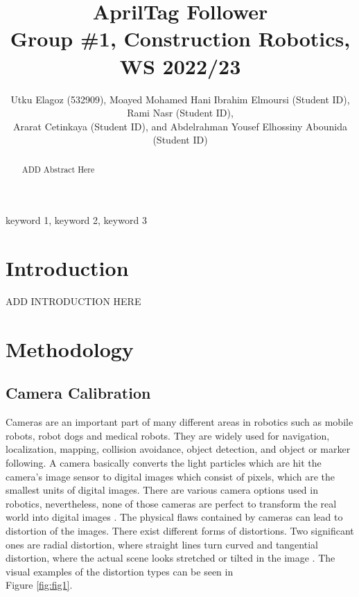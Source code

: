 \documentclass[conference]{IEEEtran}
\begin{document}
\title{AprilTag Follower\\
{\footnotesize Group \#1, Construction Robotics, WS 2022/23}
}

\author{Utku Elagoz (532909), Moayed Mohamed Hani Ibrahim Elmoursi (Student ID), Rami Nasr (Student ID),\\ Ararat Cetinkaya (Student ID), and Abdelrahman Yousef Elhossiny Abounida (Student ID)}

\maketitle
\thispagestyle{plain}
\pagestyle{plain}

\begin{abstract}
ADD Abstract Here
\end{abstract}

\begin{IEEEkeywords}
keyword 1, keyword 2, keyword 3
\end{IEEEkeywords}

\section{Introduction}
ADD INTRODUCTION HERE

\section{Methodology}
    \subsection{Camera Calibration}
        Cameras are an important part of many different areas in robotics such as mobile robots, robot dogs and medical robots. They are widely used for navigation, localization, mapping, collision avoidance, object detection, and object or marker following. A camera basically converts the light particles which are hit the camera’s image sensor to digital images which consist of pixels, which are the smallest units of digital images. There are various camera options used in robotics, nevertheless, none of those cameras are perfect to transform the real world into digital images \cite{b1}. The physical flaws contained by cameras can lead to distortion of the images. There exist different forms of distortions. Two significant ones are radial distortion, where straight lines turn curved and tangential distortion, where the actual scene looks stretched or tilted in the image \cite{b2}. The visual examples of the distortion types can be seen in \\Figure \ref{fig:fig1}.
        
\end{document}
